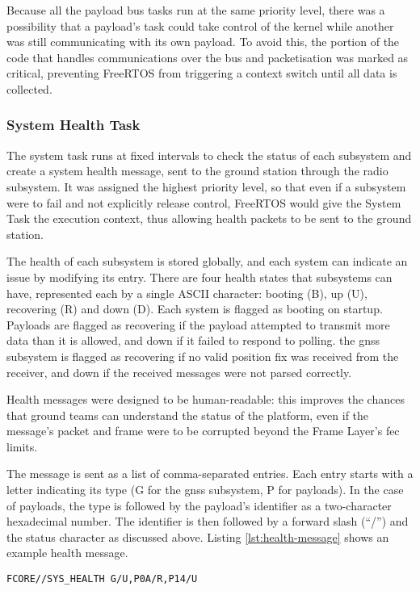 Because all the payload bus tasks run at the same priority level, there was a
possibility that a payload's task could take control of the kernel while another
was still communicating with its own payload. To avoid this, the portion of the
code that handles communications over the bus and packetisation was marked
as critical, preventing FreeRTOS from triggering a context switch until all data
is collected.

\subsubsection{System Health Task}

The system task runs at fixed intervals to check the status of each subsystem
and create a system health message, sent to the ground station through the
radio subsystem. It was assigned the highest priority level, so that even if a
subsystem were to fail and not explicitly release control, FreeRTOS would give
the System Task the execution context, thus allowing health packets to be sent
to the ground station.

The health of each subsystem is stored globally, and each system can indicate
an issue by modifying its entry. There are four health states that subsystems
can have, represented each by a single ASCII character: booting (B), up (U),
recovering (R) and down (D). Each system is flagged as booting on startup.
Payloads are flagged as recovering if the payload attempted to transmit more
data than it is allowed, and down if it failed to respond to polling. the
\acrshort{gnss} subsystem is flagged as recovering if no valid position fix was
received from the receiver, and down if the received messages were not parsed
correctly.

Health messages were designed to be human-readable: this improves the chances
that ground teams can understand the status of the platform, even if the
message's packet and frame were to be corrupted beyond the Frame Layer's
\acrshort{fec} limits.

The message is sent as a list of comma-separated entries. Each entry starts
with a letter indicating its type (G for the \acrshort{gnss} subsystem, P for
payloads). In the case of payloads, the type is followed by the payload's
identifier as a two-character hexadecimal number. The identifier is then
followed by a forward slash (``/'') and the status character as discussed above.
Listing \ref{lst:health-message} shows an example health message.

\begin{lstlisting}[caption=FCORE - Example Health Message, label=lst:health-message]
FCORE//SYS_HEALTH G/U,P0A/R,P14/U
\end{lstlisting}

